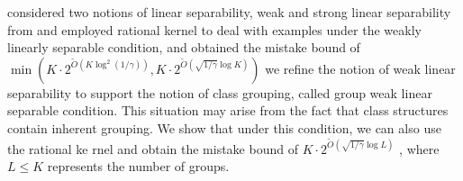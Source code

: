 \cite{BeygelzimerPSTWZ2019-separable} considered two notions of linear separability, weak and strong linear
separability from \cite{CrammerS2003-ultraconservative}
and employed rational kernel to deal with examples under the weakly linearly separable condition, and obtained
the mistake bound of 
$\min(K\cdot 2^{\tilde{O}(K\log^2(1/\gamma))},K\cdot 2^{\tilde{O}(\sqrt{1/\gamma}\log K)})$
we refine the notion of weak linear separability to
support the notion of class grouping, called group weak linear
separable condition. This situation may arise from the fact that
class structures contain inherent grouping. We show that under
this condition, we can also use the rational ke
rnel and obtain the
mistake bound of $K\cdot 2^{\tilde{O}(\sqrt{1/\gamma}\log L)}$ , where $L\leq K$ represents
the number of groups.
